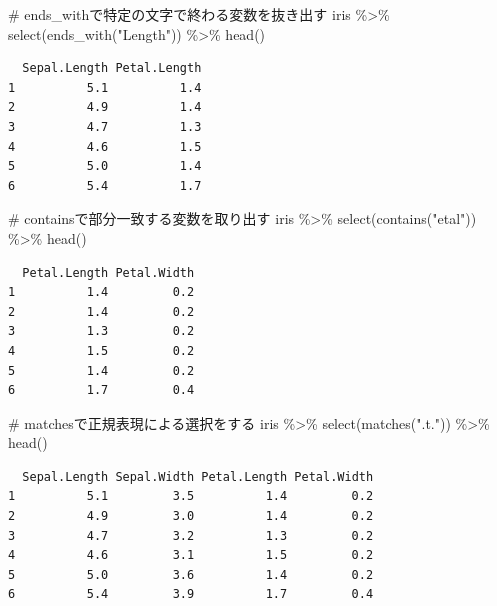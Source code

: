 \documentclass[
  a4paper,
]{book}
\newenvironment{Shaded}{\begin{snugshade}}{\end{snugshade}}
\newcommand{\CommentTok}[1]{\textcolor[rgb]{0.37,0.37,0.37}{#1}}
\newcommand{\FunctionTok}[1]{\textcolor[rgb]{0.28,0.35,0.67}{#1}}
\newcommand{\NormalTok}[1]{\textcolor[rgb]{0.00,0.23,0.31}{#1}}
\newcommand{\SpecialCharTok}[1]{\textcolor[rgb]{0.37,0.37,0.37}{#1}}
\newcommand{\StringTok}[1]{\textcolor[rgb]{0.13,0.47,0.30}{#1}}
\begin{document}
\begin{Shaded}
\begin{Highlighting}[]
\CommentTok{\# ends\_withで特定の文字で終わる変数を抜き出す}
\NormalTok{iris }\SpecialCharTok{\%\textgreater{}\%}
  \FunctionTok{select}\NormalTok{(}\FunctionTok{ends\_with}\NormalTok{(}\StringTok{"Length"}\NormalTok{)) }\SpecialCharTok{\%\textgreater{}\%}
  \FunctionTok{head}\NormalTok{()}
\end{Highlighting}
\end{Shaded}

\begin{verbatim}
  Sepal.Length Petal.Length
1          5.1          1.4
2          4.9          1.4
3          4.7          1.3
4          4.6          1.5
5          5.0          1.4
6          5.4          1.7
\end{verbatim}

\begin{Shaded}
\begin{Highlighting}[]
\CommentTok{\# containsで部分一致する変数を取り出す}
\NormalTok{iris }\SpecialCharTok{\%\textgreater{}\%}
  \FunctionTok{select}\NormalTok{(}\FunctionTok{contains}\NormalTok{(}\StringTok{"etal"}\NormalTok{)) }\SpecialCharTok{\%\textgreater{}\%}
  \FunctionTok{head}\NormalTok{()}
\end{Highlighting}
\end{Shaded}

\begin{verbatim}
  Petal.Length Petal.Width
1          1.4         0.2
2          1.4         0.2
3          1.3         0.2
4          1.5         0.2
5          1.4         0.2
6          1.7         0.4
\end{verbatim}

\begin{Shaded}
\begin{Highlighting}[]
\CommentTok{\# matchesで正規表現による選択をする}
\NormalTok{iris }\SpecialCharTok{\%\textgreater{}\%}
  \FunctionTok{select}\NormalTok{(}\FunctionTok{matches}\NormalTok{(}\StringTok{".t."}\NormalTok{)) }\SpecialCharTok{\%\textgreater{}\%}
  \FunctionTok{head}\NormalTok{()}
\end{Highlighting}
\end{Shaded}

\begin{verbatim}
  Sepal.Length Sepal.Width Petal.Length Petal.Width
1          5.1         3.5          1.4         0.2
2          4.9         3.0          1.4         0.2
3          4.7         3.2          1.3         0.2
4          4.6         3.1          1.5         0.2
5          5.0         3.6          1.4         0.2
6          5.4         3.9          1.7         0.4
\end{verbatim}
\end{document}

